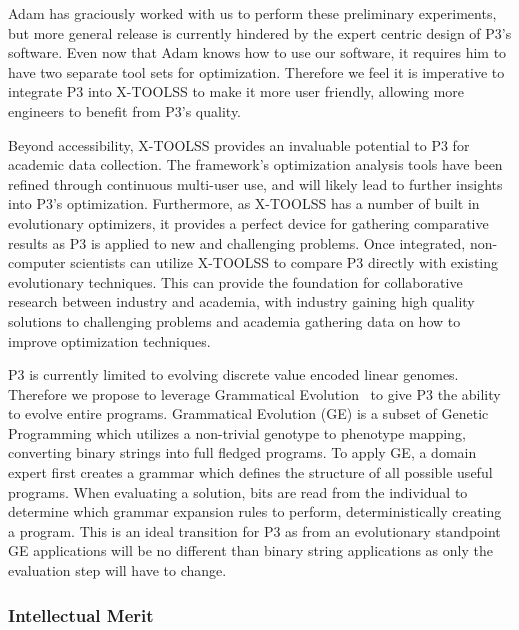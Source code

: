 \documentclass{article}
\newcommand{\includegraphicsfit}[1]
{\texttt{[image: \#1]}}
\begin{document}
Adam has graciously worked with us to perform these preliminary experiments, but more general
release is currently hindered by the expert centric design of P3's software.  Even now that Adam
knows how to use our software, it requires him to have two separate tool sets for optimization.
Therefore we feel it is imperative to integrate P3 into X-TOOLSS to make it more user friendly,
allowing more engineers to benefit from P3's quality.

Beyond accessibility, X-TOOLSS provides an invaluable potential to P3 for academic data collection.
The framework's optimization analysis tools have been refined through continuous multi-user use, and
will likely lead to further insights into P3's optimization.  Furthermore, as X-TOOLSS has a number
of built in evolutionary optimizers, it provides a perfect device for gathering comparative results
as P3 is applied to new and challenging problems.  Once integrated, non-computer scientists can utilize
X-TOOLSS to compare P3 directly with existing evolutionary techniques.  This can provide the foundation
for collaborative research between industry and academia, with industry gaining high quality solutions
to challenging problems and academia gathering data on how to improve optimization techniques.


P3 is currently limited to evolving discrete value encoded linear genomes. 
Therefore we propose to leverage Grammatical Evolution~\cite{oneill:2001:grammatical}
to give P3 the ability to evolve entire programs.  Grammatical Evolution (GE) is a subset
of Genetic Programming which utilizes a non-trivial genotype to phenotype mapping, converting
binary strings into full fledged programs.  To apply GE, a domain expert first creates a
grammar which defines the structure of all possible useful programs.  When evaluating a
solution, bits are read from the individual to determine which grammar expansion rules to perform,
deterministically creating a program.  This is an ideal transition for P3 as from an
evolutionary standpoint GE applications will be no different than binary string applications as
only the evaluation step will have to change.

\subsubsection*{Intellectual Merit}
\end{document}
